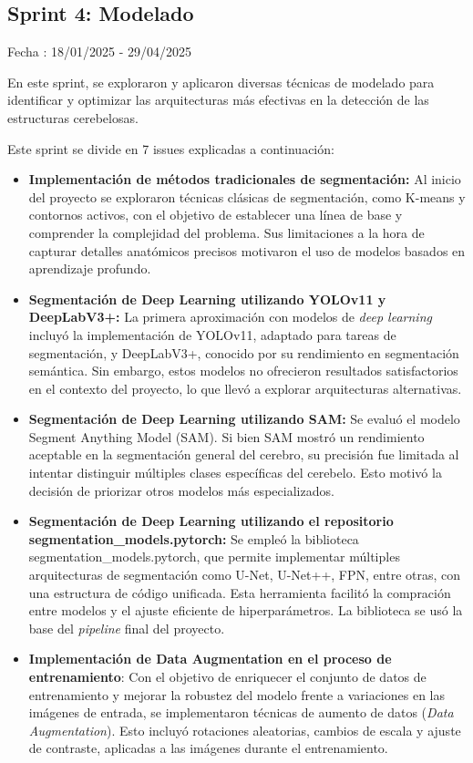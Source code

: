 \subsection{Sprint 4: Modelado}

Fecha : 18/01/2025 - 29/04/2025

En este sprint, se exploraron y aplicaron diversas técnicas de modelado para identificar y optimizar las arquitecturas más efectivas en la detección de las estructuras cerebelosas.

Este sprint se divide en 7 issues explicadas a continuación:
\begin{itemize}
    \item \textbf{Implementación de métodos tradicionales de segmentación:} Al inicio del proyecto se exploraron técnicas clásicas de segmentación, como K-means y contornos activos, con el objetivo de establecer una línea de base y comprender la complejidad del problema. Sus limitaciones a la hora de capturar detalles anatómicos precisos motivaron el uso de modelos basados en aprendizaje profundo.
    \item \textbf{Segmentación de Deep Learning utilizando YOLOv11 y DeepLabV3+:} La primera aproximación con modelos de \textit{deep learning} incluyó la implementación de YOLOv11, adaptado para tareas de segmentación, y DeepLabV3+, conocido por su rendimiento en segmentación semántica. Sin embargo, estos modelos no ofrecieron resultados satisfactorios en el contexto del proyecto, lo que llevó a explorar arquitecturas alternativas.
    \item \textbf{Segmentación de Deep Learning utilizando SAM:} Se evaluó el modelo Segment Anything Model (SAM). Si bien SAM mostró un rendimiento aceptable en la segmentación general del cerebro, su precisión fue limitada al intentar distinguir múltiples clases específicas del cerebelo. Esto motivó la decisión de priorizar otros modelos más especializados. 
    \item \textbf{Segmentación de Deep Learning utilizando el repositorio segmentation\_models.pytorch:} Se empleó la biblioteca segmentation\_models.pytorch, que permite implementar múltiples arquitecturas de segmentación como U-Net, U-Net++, FPN, entre otras, con una estructura de código unificada. Esta herramienta facilitó la compración entre modelos y el ajuste eficiente de hiperparámetros. La biblioteca se usó la base del \textit{pipeline} final del proyecto.
    \item \textbf{Implementación de Data Augmentation en el proceso de entrenamiento}: Con el objetivo de enriquecer el conjunto de datos de entrenamiento y mejorar la robustez del modelo frente a variaciones en las imágenes de entrada, se implementaron técnicas de aumento de datos (\textit{Data Augmentation}). Esto incluyó rotaciones aleatorias, cambios de escala y ajuste de contraste, aplicadas a las imágenes durante el entrenamiento.

\end{itemize}
